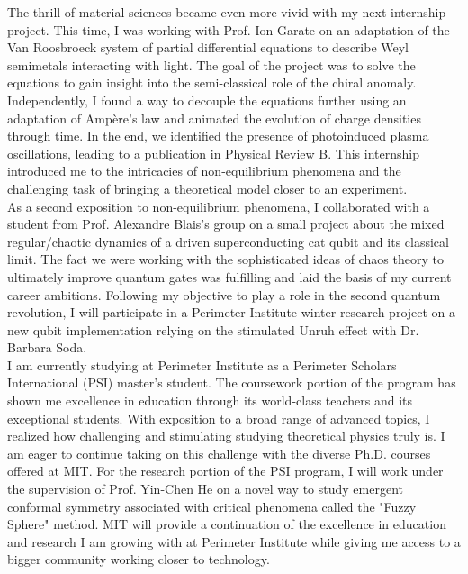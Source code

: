\documentclass[12pt]{article}
\begin{document}
The thrill of material sciences became even more vivid with my next internship project. This time, I was working with Prof. Ion Garate on an adaptation of the Van Roosbroeck system of partial differential equations to describe Weyl semimetals interacting with light. The goal of the project was to solve the equations to gain insight into the semi-classical role of the chiral anomaly. Independently, I found a way to decouple the equations further using an adaptation of Ampère's law and animated the evolution of charge densities through time. In the end, we identified the presence of photoinduced plasma oscillations, leading to a publication in Physical Review B. This internship introduced me to the intricacies of non-equilibrium phenomena and the challenging task of bringing a theoretical model closer to an experiment.\\[0.2cm] 

As a second exposition to non-equilibrium phenomena, I collaborated with a student from Prof. Alexandre Blais's group on a small project about the mixed regular/chaotic dynamics of a driven superconducting cat qubit and its classical limit. The fact we were working with the sophisticated ideas of chaos theory to ultimately improve quantum gates was fulfilling and laid the basis of my current career ambitions. Following my objective to play a role in the second quantum revolution, I will participate in a Perimeter Institute winter research project on a new qubit implementation relying on the stimulated Unruh effect with Dr. Barbara Soda. \\[0.2cm]


I am currently studying at Perimeter Institute as a Perimeter Scholars International (PSI) master's student. The coursework portion of the program has shown me excellence in education through its world-class teachers and its exceptional students. With exposition to a broad range of advanced topics, I realized how challenging and stimulating studying theoretical physics truly is. I am eager to continue taking on this challenge with the diverse Ph.D. courses offered at MIT. For the research portion of the PSI program, I will work under the supervision of Prof. Yin-Chen He on a novel way to study emergent conformal symmetry associated with critical phenomena called the "Fuzzy Sphere" method. MIT will provide a continuation of the excellence in education and research I am growing with at Perimeter Institute while giving me access to a bigger community working closer to technology. \\[0.2cm]
\end{document}

